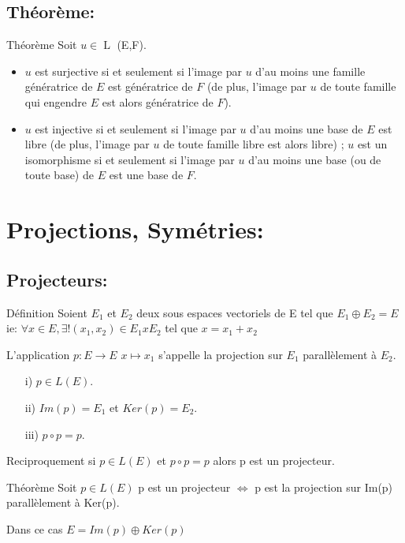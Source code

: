 \documentclass{book}
\begin{document}
\subsection{Théorème: }
\begin{Théorème}[]{Théorème}{}
Soit ${\displaystyle u\in \operatorname {L}}$ (E,F).
\begin{itemize}
    \item ${\displaystyle u}$ est surjective si et seulement si l'image par ${\displaystyle u}$ d'au moins une famille génératrice de ${\displaystyle E}$ est génératrice de ${\displaystyle F}$ (de plus, l'image par ${\displaystyle u}$ de toute famille qui engendre ${\displaystyle E}$ est alors génératrice de ${\displaystyle F}$).
    \item ${\displaystyle u}$ est injective si et seulement si l'image par ${\displaystyle u}$ d'au moins une base de ${\displaystyle E}$ est libre (de plus, l'image par ${\displaystyle u}$ de toute famille libre est alors libre) ;
${\displaystyle u}$ est un isomorphisme si et seulement si l'image par ${\displaystyle u}$ d'au moins une base (ou de toute base) de ${\displaystyle E}$ est une base de ${\displaystyle F}$.
\end{itemize}  
\end{Théorème}

\section{Projections, Symétries: }
\subsection{Projecteurs: }
\begin{Définition}[]{Définition}{}
Soient $E_{1}$ et $E_{2}$ deux sous espaces vectoriels de E tel que ${\displaystyle E_{1} \oplus E_{2}=E}$ ie:
${\displaystyle \forall x \in E, \exists! (x_{1}, x_{2}) \in E_{1} {x} E_{2}}$ tel que ${\displaystyle x=x_{1}+x_{2}}$

L'application ${\displaystyle  p:E\to E}$
${x\mapsto x_{1}}$ s'appelle la projection sur $E_{1}$ parallèlement à $E_{2}$.
\begin{itemize}
    \item[i)] ${\displaystyle p \in L(E)}.$
    \item[ii)] ${\displaystyle Im(p)=E_{1}}$ et ${\displaystyle Ker(p)=E_{2}}.$
    \item[iii)] ${\displaystyle p \circ p = p}.$
\end{itemize}
Reciproquement si ${\displaystyle p \in L(E)}$ et ${\displaystyle p \circ p = p}$ alors p est un projecteur.
\end{Définition}
\begin{Théorème}[]{Théorème}{}
    Soit ${\displaystyle p \in L(E)}$
    p est un projecteur ${\Leftrightarrow}$ p est la projection sur Im(p) parallèlement à Ker(p).
    
    Dans ce cas ${\displaystyle E= Im(p) \oplus Ker(p)}$
\end{Théorème}
\end{document}
